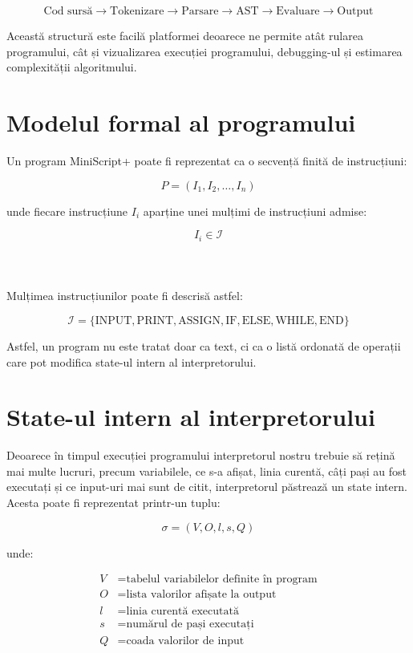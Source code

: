 \documentclass[12pt]{article}
\begin{document}
\[
\text{Cod sursă}
\longrightarrow
\text{Tokenizare}
\longrightarrow
\text{Parsare}
\longrightarrow
\text{AST}
\longrightarrow
\text{Evaluare}
\longrightarrow
\text{Output}
\]

Această structură este facilă platformei deoarece ne permite atât rularea programului, cât și vizualizarea execuției programului, debugging-ul și estimarea complexității algoritmului.

\section{Modelul formal al programului}

Un program MiniScript+ poate fi reprezentat ca o secvență finită de instrucțiuni:

\[
P = (I_1, I_2, \ldots, I_n)
\]

unde fiecare instrucțiune \(I_i\) aparține unei mulțimi de instrucțiuni admise:

\[
I_i \in \mathcal{I}
\]
\\
\\
\\
Mulțimea instrucțiunilor poate fi descrisă astfel:

\[
\mathcal{I} =
\{
\text{INPUT},
\text{PRINT},
\text{ASSIGN},
\text{IF},
\text{ELSE},
\text{WHILE},
\text{END}
\}
\]

Astfel, un program nu este tratat doar ca text, ci ca o listă ordonată de operații care pot modifica state-ul intern al interpretorului.

\section{State-ul intern al interpretorului}

Deoarece în timpul execuției programului interpretorul nostru trebuie să rețină mai multe lucruri, precum variabilele, ce s-a afișat, linia curentă, câți pași au fost executați și ce input-uri mai sunt de citit, interpretorul păstrează un state intern. Acesta poate fi reprezentat printr-un tuplu:

\[
\sigma = (V, O, l, s, Q)
\]

unde:

\[
\begin{aligned}
V &= \text{tabelul variabilelor definite în program} \\
O &= \text{lista valorilor afișate la output} \\
l &= \text{linia curentă executată} \\
s &= \text{numărul de pași executați} \\
Q &= \text{coada valorilor de input}
\end{aligned}
\]
\end{document}
